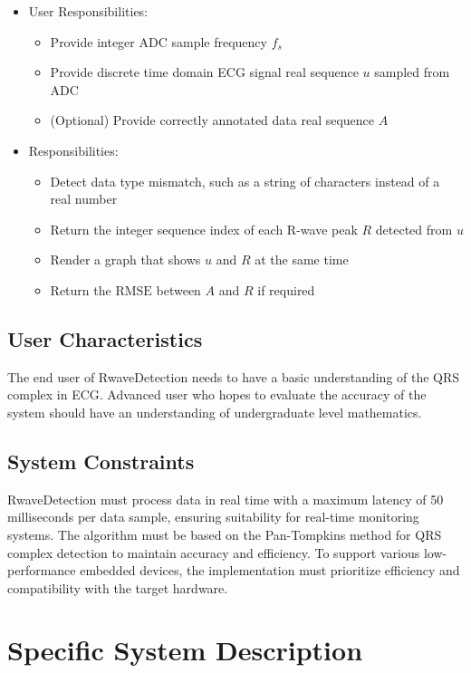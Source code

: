 \documentclass[12pt]{article}
\begin{document}
\begin{itemize}
\item User Responsibilities:
\begin{itemize}
\item Provide integer ADC sample frequency $f_s$
\item Provide discrete time domain ECG signal real sequence $u$ sampled from ADC
\item (Optional) Provide correctly annotated data real sequence $A$
\end{itemize}
\item \progname{} Responsibilities:
\begin{itemize}
\item Detect data type mismatch, such as a string of characters instead of a
  real number
\item Return the integer sequence index of each R-wave peak $R$ detected from
$u$
\item Render a graph that shows $u$ and $R$ at the same time
\item Return the $\text{RMSE}$ between $A$ and $R$ if required
\end{itemize}
\end{itemize}

\subsection{User Characteristics} \label{SecUserCharacteristics}

The end user of RwaveDetection needs to have a basic understanding of the QRS
complex in ECG.  Advanced user who hopes to evaluate the accuracy of the system
should have an understanding of undergraduate level mathematics.

\subsection{System Constraints}

RwaveDetection must process data in real time with a maximum latency of 50
milliseconds per data sample, ensuring suitability for real-time monitoring
systems. The algorithm must be based on the Pan-Tompkins method for QRS complex
detection to maintain accuracy and efficiency. To support various
low-performance embedded devices, the implementation must prioritize efficiency
and compatibility with the target hardware.

\section{Specific System Description}
\end{document}
